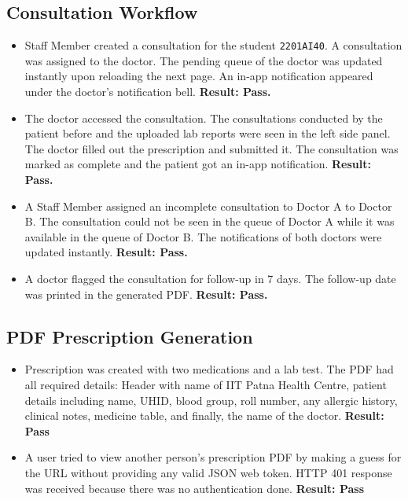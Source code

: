 \subsection{Consultation Workflow}

\begin{itemize}
  \item Staff Member created a consultation for the student \texttt{2201AI40}. A consultation was assigned to the doctor. The pending queue of the doctor was updated instantly upon reloading the next page. An in-app notification appeared under the doctor’s notification bell. \textbf{Result: Pass.}

  \item The doctor accessed the consultation. The consultations conducted by the patient before and the uploaded lab reports were seen in the left side panel. The doctor filled out the prescription and submitted it. The consultation was marked as complete and the patient got an in-app notification. \textbf{Result: Pass.}

  \item A Staff Member assigned an incomplete consultation to Doctor A to Doctor B. The consultation could not be seen in the queue of Doctor A while it was available in the queue of Doctor B. The notifications of both doctors were updated instantly. \textbf{Result: Pass.}

  \item A doctor flagged the consultation for follow-up in 7 days. The follow-up date was printed in the generated PDF. \textbf{Result: Pass.}
\end{itemize}

\subsection{PDF Prescription Generation}

\begin{itemize}
  \item Prescription was created with two medications and a lab test.
  The PDF had all required details: Header with name of IIT Patna
  Health Centre, patient details including name, UHID, blood group,
  roll number, any allergic history, clinical notes, medicine
  table, and finally, the name of the doctor. \textbf{Result: Pass}

  \item A user tried to view another person’s prescription PDF by
  making a guess for the URL without providing any valid JSON web
  token. HTTP 401 response was received because there was no
  authentication done. \textbf{Result: Pass}
\end{itemize}

